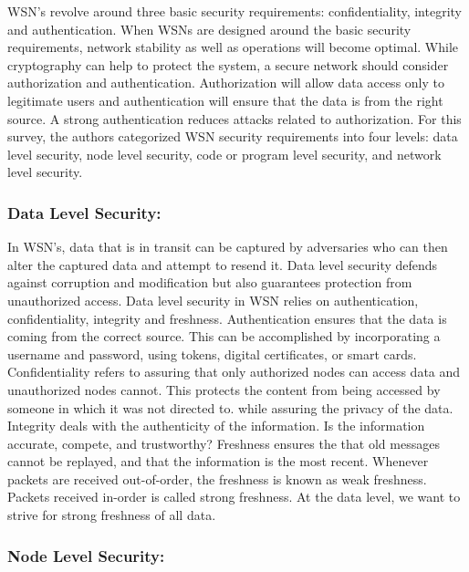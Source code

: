 WSN’s revolve around three basic security requirements: confidentiality, integrity and authentication. When WSNs are designed around the basic security requirements, network stability as well as operations will become optimal. While cryptography can help to protect the system, a secure network should consider authorization and authentication. Authorization will allow data access only to legitimate users and authentication will ensure that the data is from the right source. A strong authentication reduces attacks related to authorization. For this survey, the authors categorized WSN security requirements into four levels: data level security, node level security, code or program level security, and network level security. \cite {karakaya2018survey}

\subsubsection {Data Level Security:}
\smallskip 

In WSN’s, data that is in transit can be captured by adversaries who can then alter the captured data and attempt to resend it. Data level security defends against corruption and modification but also guarantees protection from unauthorized access. Data level security in WSN relies on authentication, confidentiality, integrity and freshness. Authentication ensures that the data is coming from the correct source. This can be accomplished by incorporating a username and password, using tokens, digital certificates, or smart cards. Confidentiality refers to assuring that only authorized nodes can access data and unauthorized nodes cannot. This protects the content from being accessed by someone in which it was not directed to. while assuring the privacy of the data. Integrity deals with the authenticity of the information. Is the information accurate, compete, and trustworthy? Freshness ensures the that old messages cannot be replayed, and that the information is the most recent. Whenever packets are received out-of-order, the freshness is known as weak freshness. Packets received in-order is called strong freshness. At the data level, we want to strive for strong freshness of all data. 

\subsubsection {Node Level Security:}
\smallskip

